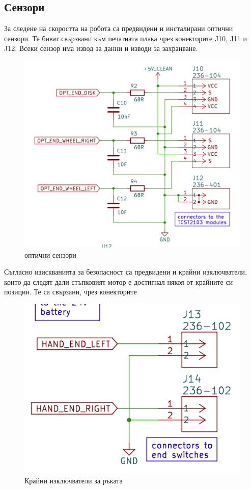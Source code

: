 \subsection{Сензори}

За следене на скоростта на робота са предвидени и инсталирани оптични сензори. Те биват свързвани към печатната плака чрез конекторите J10, J11 и J12. Всеки сензор има извод за данни и изводи за захранване. 

\begin{figure}[H]
    \centering
    \includegraphics[width=0.6\linewidth]{images/optical-sensors.png}
    
    \caption{оптични сензори}
    \label{fig:optical-sensors} 
\end{figure}

Съгласно изискванията за безопасност са предвидени и крайни изключватели, които да следят дали стъпковият мотор е достигнал някоя от крайните си позиции. Те са свързани, чрез конекторите

\begin{figure}[H]
    \centering
    \includegraphics[width=0.6\linewidth]{images/hand-endswitches.png}
    
    \caption{Крайни изключватели за ръката}
    \label{fig:hand-endswitches} 
\end{figure}


